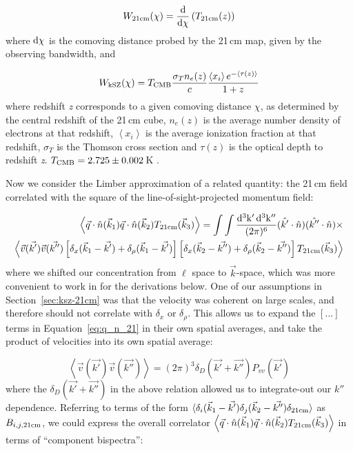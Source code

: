 \begin{equation}
W_{\rm 21cm}(\chi) = {\rm \frac{d}{d\chi}}\left(T_{\rm 21cm}(z)\right)
\label{eq:W21cm}
\end{equation}
where ${\rm d\chi}$ is the comoving distance probed by the 21\,cm map, given by the observing bandwidth, and

\begin{equation}
W_{\rm kSZ}(\chi) = T_{\rm CMB} \frac{\sigma_T n_e(z)}{c}\frac{\left\langle x_i \right\rangle e^{-\left\langle \tau(z) \right\rangle } }{1+z}
\label{eq:WkSZ}
\end{equation}
where redshift \textit{z} corresponds to a given comoving distance $\chi$, as determined by the central redshift of the 21\,cm cube, $n_e(z)$ is the average number density of electrons at that redshift, $\left\langle x_i \right\rangle $ is the average ionization fraction at that redshift, $\sigma_T$ is the Thomson cross section and $\tau (z)$ is the optical depth to redshift \textit{z}. $T_{\rm CMB} = 2.725\pm0.002$\,K \citep{Mather.99}.

Now we consider the Limber approximation of a related quantity: the 21\,cm field correlated with the square of the line-of-sight-projected momentum field:

\begin{equation}
\begin{split}
\left\langle \vec{q} \cdot \hat{n}(\vec{k}_1) \vec{q} \cdot \hat{n} (\vec{k}_2) T_{\rm 21cm}(\vec{k}_3) \right\rangle =
\int \int \frac{ {\rm d^3k' \, d^3k''} }{(2\pi)^6} (\hat{k'}\cdot\hat{n}) (\hat{k''}\cdot\hat{n}) \times \\
\left\langle 
\vec{v}(\vec{k'})\vec{v}(\vec{k''}) 
\left[ \delta_x(\vec{k}_1 - \vec{k'}) + \delta_{\rho}(\vec{k}_1 - \vec{k'})\right]
\left[ \delta_x(\vec{k}_2 - \vec{k''}) + \delta_{\rho}(\vec{k}_2 - \vec{k''})\right] 
T_{\rm 21cm}(\vec{k}_3)
\right\rangle
\end{split}
\label{eq:q_n_21}
\end{equation}
where we shifted our concentration from $\ell$ space to $\vec{k}$-space, which was more convenient to work in for the derivations below.
One of our assumptions in Section~\ref{sec:ksz-21cm} was that the velocity was coherent on large scales, and therefore should not correlate with $\delta_{x}$ or $\delta_{\rho}$. This allows us to expand the $[...]$ terms in Equation~\ref{eq:q_n_21} in their own spatial averages, and take the product of velocities into its own spatial average:

\begin{equation}
\left\langle \vec{v}(\vec{k'})\vec{v}(\vec{k''}) \right\rangle = (2\pi)^3 \delta_D(\vec{k'} + \vec{k''})P_{vv}(\vec{k'})
\label{eq:Pvv}
\end{equation}
where the $\delta_D(\vec{k'} + \vec{k''})$ in the above relation allowed us to integrate-out our $k''$ dependence. Referring to terms of the form $\langle \delta_i(\vec{k}_1 - \vec{k'}) \delta_j(\vec{k}_2 - \vec{k''}) \delta_{\rm 21cm}\rangle$ as $B_{i,j,{\rm 21cm}}$, we could express the overall correlator $\left\langle \vec{q} \cdot \hat{n}(\vec{k}_1) \vec{q} \cdot \hat{n} (\vec{k}_2) T_{\rm 21cm}(\vec{k}_3) \right\rangle$ in terms of ``component bispectra'':

